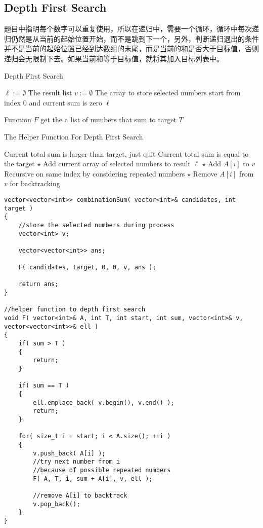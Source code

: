 \subsection{Depth First Search}
题目中指明每个数字可以重复使用，所以在递归中，需要一个循环，循环中每次递归仍然是从当前的起始位置开始，而不是跳到下一个，另外，判断递归退出的条件并不是当前的起始位置已经到达数组的末尾，而是当前的和是否大于目标值，否则递归会无限制下去。如果当前和等于目标值，就将其加入目标列表中。

\setcounter{algorithm}{0}
\begin{algorithm}[H]
\caption{Depth First Search}
\begin{algorithmic}[1]
\State $\ell := \emptyset$ \Comment The result list
\State $v := \emptyset$ \Comment The array to store selected numbers
\State {} \Comment start from index 0 and current sum is zero
\State \Return $\ell$
\EndProcedure
\end{algorithmic}
\end{algorithm}

Function $F$ get the a list of numbers that sum to target $T$
\begin{algorithm}[H]
\caption{The Helper Function For Depth First Search}
\begin{algorithmic}[1]
 \Comment Current total sum is larger than target, just quit
\State \Return 
\EndIf
{} \Comment Current total sum is equal to the target
\State $\star$ Add current array of selected numbers to result $\ell$
\EndIf
{}
\State $\star$ Add $A[i]$ to $v$ 
\State {} \Comment Recursive on same index by considering repeated numbers
\State $\star$ Remove $A[i]$ from $v$ for backtracking
\EndFor
\EndFunction
\end{algorithmic}
\end{algorithm}

\setcounter{lstlisting}{0}
\begin{lstlisting}[style=customc, caption={DFS}]
vector<vector<int>> combinationSum( vector<int>& candidates, int target )
{
    //store the selected numbers during process
    vector<int> v;

    vector<vector<int>> ans;

    F( candidates, target, 0, 0, v, ans );

    return ans;
}

//helper function to depth first search
void F( vector<int>& A, int T, int start, int sum, vector<int>& v, vector<vector<int>>& ell )
{
    if( sum > T )
    {
        return;
    }

    if( sum == T )
    {
        ell.emplace_back( v.begin(), v.end() );
        return;
    }

    for( size_t i = start; i < A.size(); ++i )
    {
        v.push_back( A[i] );
        //try next number from i
        //because of possible repeated numbers
        F( A, T, i, sum + A[i], v, ell );

        //remove A[i] to backtrack
        v.pop_back();
    }
}
\end{lstlisting}